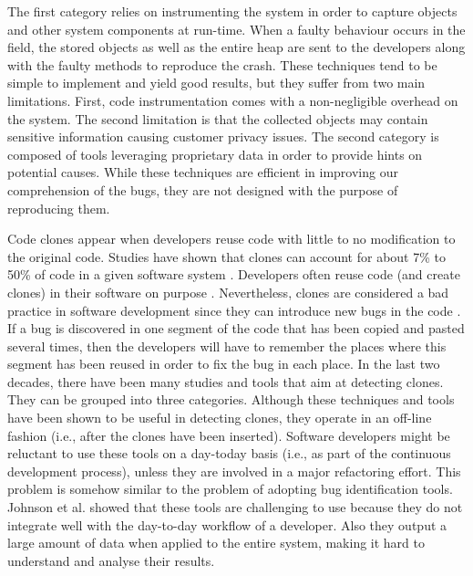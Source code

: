 The first category relies on instrumenting the system in order to capture objects and other system components at run-time.
When a faulty behaviour occurs in the field, the stored objects as well as the entire heap are sent to the developers along with the faulty methods to reproduce the crash.
These techniques tend to be simple to implement and yield good results, but they suffer from two main limitations.
First, code instrumentation comes with a non-negligible overhead on the system.
The second limitation is that the collected objects may contain sensitive information causing customer privacy issues.
The second category is composed of tools leveraging proprietary data in order to provide hints on potential causes.
While these techniques are efficient in improving our comprehension of the bugs, they are not designed with the purpose of reproducing them.


Code clones appear when developers reuse code with little to no modification to the original code.
Studies have shown that clones can account for about 7\% to 50\% of code in a given software system \cite{Baker, StephaneDucasse}. Developers often reuse code (and create clones) in their software on purpose \cite{Kim2005}.
Nevertheless, clones are considered a bad practice in software development since they can introduce new bugs in the code \cite{Kapser2006,Juergens2009,Li2006}. If a bug is discovered in one segment of the code that has been copied and pasted several times, then the developers will have to remember the places where this segment has been reused in order to fix the bug in each place. In the last two decades, there have been many studies and tools that aim at detecting clones.
They can be grouped into three categories. Although these techniques and tools have been shown to be useful in detecting clones, they operate in an off-line fashion (i.e., after the clones have been inserted). Software developers might be reluctant to use these tools on a day-today basis (i.e., as part of the continuous development process), unless they are involved in a major refactoring effort. This problem is somehow similar to the problem of adopting bug identification tools. Johnson et al. \cite{Johnson2013} showed that these tools are challenging to use because they do not integrate well with the day-to-day workflow of a developer. Also they output a large amount of data when applied to the entire system, making it hard to understand and analyse their results.

